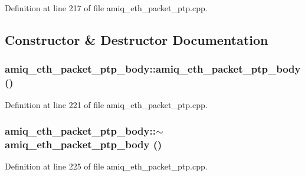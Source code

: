 Definition at line 217 of file amiq\_\-eth\_\-packet\_\-ptp.cpp.

\subsection{Constructor \& Destructor Documentation}
\hypertarget{classamiq__eth__packet__ptp__body_a9bc5473367cced49e72242ea64262c52}{
\subsubsection[{amiq\_\-eth\_\-packet\_\-ptp\_\-body}]{\setlength{\rightskip}{0pt plus 5cm}amiq\_\-eth\_\-packet\_\-ptp\_\-body::amiq\_\-eth\_\-packet\_\-ptp\_\-body ()}}
\label{classamiq__eth__packet__ptp__body_a9bc5473367cced49e72242ea64262c52}


Definition at line 221 of file amiq\_\-eth\_\-packet\_\-ptp.cpp.\hypertarget{classamiq__eth__packet__ptp__body_a6fe39e892a2b0b45c7b5046c858bff07}{
\subsubsection[{$\sim$amiq\_\-eth\_\-packet\_\-ptp\_\-body}]{\setlength{\rightskip}{0pt plus 5cm}amiq\_\-eth\_\-packet\_\-ptp\_\-body::$\sim$amiq\_\-eth\_\-packet\_\-ptp\_\-body ()}}
\label{classamiq__eth__packet__ptp__body_a6fe39e892a2b0b45c7b5046c858bff07}


Definition at line 225 of file amiq\_\-eth\_\-packet\_\-ptp.cpp.

